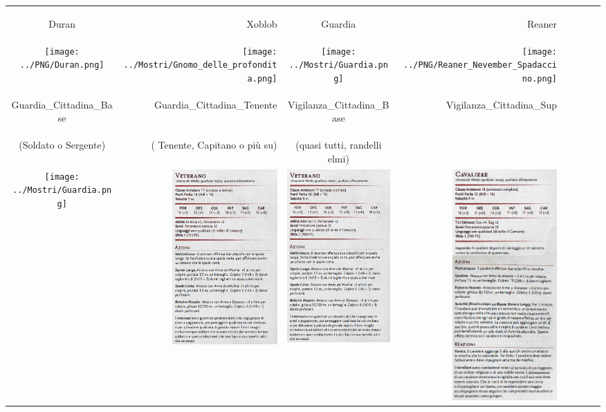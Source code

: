 \documentclass{article}
\begin{document}
\begin{table}
    \centering
    \begin{tabular}{|cr|cr|cr|cr|}
        \hline
        \hypertarget{Duran}{Duran} & \hypertarget{Xoblob}{Xoblob} & \hypertarget{guardia}{Guardia} & \hypertarget{Reaner}{Reaner} \\
        \texttt{[image: ../PNG/Duran.png]} &  \texttt{[image: ../Mostri/Gnomo\_delle\_profondita.png]} &\texttt{[image: ../Mostri/Guardia.png]} & \texttt{[image: ../PNG/Reaner\_Nevember\_Spadaccino.png]}\\
        \hline
        \hypertarget{GuardiaB}{Guardia\_Cittadina\_Base} & \hypertarget{GuardiaT}{Guardia\_Cittadina\_Tenente} & \hypertarget{VigilaB}{Vigilanza\_Cittadina\_Base } & \hypertarget{VigilanzaS}{Vigilanza\_Cittadina\_Sup}\\
        (Soldato o Sergente)&( Tenente, Capitano o più su)&(quasi tutti, randelli elmi)& \\
        \texttt{[image: ../Mostri/Guardia.png]} & \includegraphics[width=4cm, height = 6 cm]{../Mostri/Veterano.png} & \includegraphics[width=4cm, height = 6 cm]{../Mostri/Veterano.png} & \includegraphics[width=4cm, height = 6 cm]{../Mostri/Cavaliere.png} \\
        \hline


    \end{tabular}
\end{table}
\end{document}
